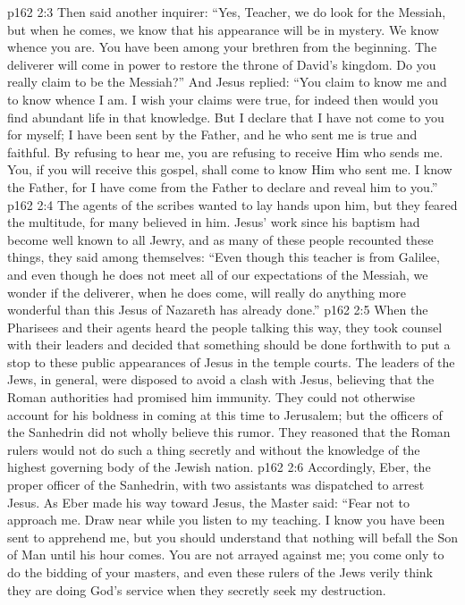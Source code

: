 \vs p162 2:3 Then said another inquirer: “Yes, Teacher, we do look for the Messiah, but when he comes, we know that his appearance will be in mystery. We know whence you are. You have been among your brethren from the beginning. The deliverer will come in power to restore the throne of David’s kingdom. Do you really claim to be the Messiah?” And Jesus replied: \textcolor{ubdarkred}{“You claim to know me and to know whence I am. I wish your claims were true, for indeed then would you find abundant life in that knowledge. But I declare that I have not come to you for myself; I have been sent by the Father, and he who sent me is true and faithful. By refusing to hear me, you are refusing to receive Him who sends me. You, if you will receive this gospel, shall come to know Him who sent me. I know the Father, for I have come from the Father to declare and reveal him to you.”}
\vs p162 2:4 The agents of the scribes wanted to lay hands upon him, but they feared the multitude, for many believed in him. Jesus’ work since his baptism had become well known to all Jewry, and as many of these people recounted these things, they said among themselves: “Even though this teacher is from Galilee, and even though he does not meet all of our expectations of the Messiah, we wonder if the deliverer, when he does come, will really do anything more wonderful than this Jesus of Nazareth has already done.”
\vs p162 2:5 When the Pharisees and their agents heard the people talking this way, they took counsel with their leaders and decided that something should be done forthwith to put a stop to these public appearances of Jesus in the temple courts. The leaders of the Jews, in general, were disposed to avoid a clash with Jesus, believing that the Roman authorities had promised him immunity. They could not otherwise account for his boldness in coming at this time to Jerusalem; but the officers of the Sanhedrin did not wholly believe this rumor. They reasoned that the Roman rulers would not do such a thing secretly and without the knowledge of the highest governing body of the Jewish nation.
\vs p162 2:6 Accordingly, Eber, the proper officer of the Sanhedrin, with two assistants was dispatched to arrest Jesus. As Eber made his way toward Jesus, the Master said: \textcolor{ubdarkred}{“Fear not to approach me. Draw near while you listen to my teaching. I know you have been sent to apprehend me, but you should understand that nothing will befall the Son of Man until his hour comes. You are not arrayed against me; you come only to do the bidding of your masters, and even these rulers of the Jews verily think they are doing God’s service when they secretly seek my destruction.}
